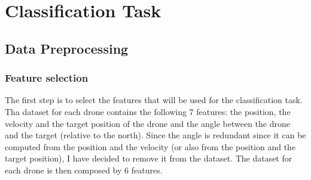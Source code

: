\section{Classification Task}
\label{sec:classification}

\subsection{Data Preprocessing}
\label{sec:preprocessing}

\subsubsection{Feature selection}
\label{sec:preprocessing-feature-selection}
The first step is to select the features that will be used for the classification task.
Tha dataset for each drone contains the following 7 features: the position, the velocity and the target position of the drone and the angle between the drone and the target (relative to the north).
Since the angle is redundant since it can be computed from the position and the velocity (or also from the position and the target position), I have decided to remove it from the dataset.
The dataset for each drone is then composed by 6 features.

